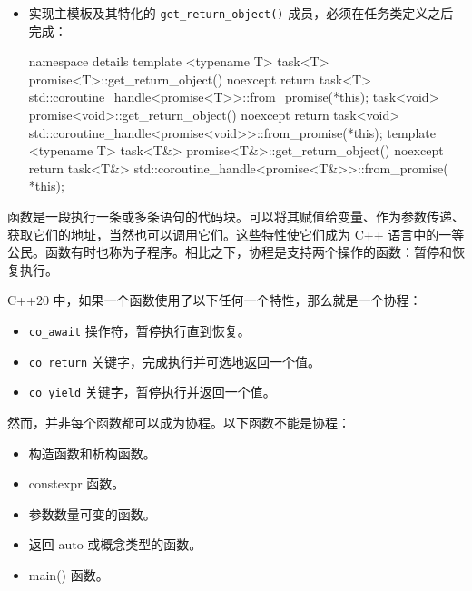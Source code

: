 \begin{itemize}
\item
实现主模板及其特化的 \verb|get_return_object()| 成员，必须在任务类定义之后完成：

\begin{cpp}
namespace details
{
    template <typename T>
    task<T> promise<T>::get_return_object() noexcept
    {
        return task<T>{
            std::coroutine_handle<promise<T>>::from_promise(*this)};
    }
    task<void> promise<void>::get_return_object() noexcept
    {
        return task<void>{
            std::coroutine_handle<promise<void>>::from_promise(*this)};
    }
    template <typename T>
    task<T&> promise<T&>::get_return_object() noexcept
    {
        return task<T&>{
            std::coroutine_handle<promise<T&>>::from_promise(
            *this)};
    }
}
\end{cpp}
\end{itemize}


函数是一段执行一条或多条语句的代码块。可以将其赋值给变量、作为参数传递、获取它们的地址，当然也可以调用它们。这些特性使它们成为 C++ 语言中的一等公民。函数有时也称为子程序。相比之下，协程是支持两个操作的函数：暂停和恢复执行。

C++20 中，如果一个函数使用了以下任何一个特性，那么就是一个协程：

\begin{itemize}
\item
\verb|co_await| 操作符，暂停执行直到恢复。

\item
\verb|co_return| 关键字，完成执行并可选地返回一个值。

\item
\verb|co_yield| 关键字，暂停执行并返回一个值。
\end{itemize}

然而，并非每个函数都可以成为协程。以下函数不能是协程：

\begin{itemize}
\item
构造函数和析构函数。

\item
constexpr 函数。

\item
参数数量可变的函数。

\item
返回 auto 或概念类型的函数。

\item
main() 函数。
\end{itemize}

